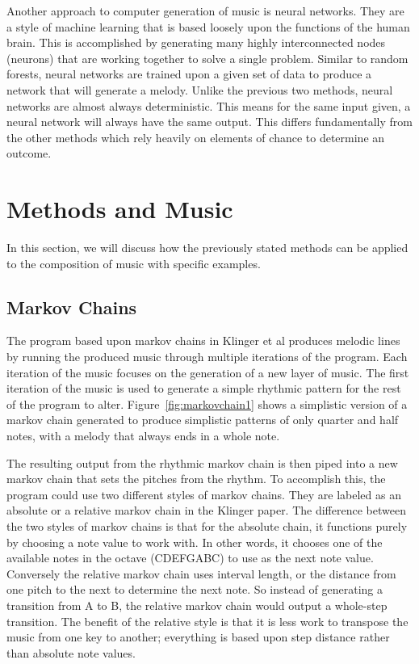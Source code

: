 \documentclass{sig-alternate}
\begin{document}
	Another approach to computer generation of music is neural networks. They are a style of machine learning that is based loosely upon the functions of the human brain. This is accomplished by generating many highly interconnected nodes (neurons) that are working together to solve a single problem. Similar to random forests, neural networks are trained upon a given set of data to produce a network that will generate a melody. Unlike the previous two methods, neural networks are almost always deterministic. This means for the same input given, a neural network will always have the same output. This differs fundamentally from the other methods which rely heavily on elements of chance to determine an outcome.

\section{Methods and Music}
\label{sec:methodsandmusic}
	In this section, we will discuss how the previously stated methods can be applied to the composition of music with specific examples.
\subsection{Markov Chains}
\label{sec:markovmethods}
	The program based upon markov chains in Klinger et al produces melodic lines by running the produced music through multiple iterations of the program. Each iteration of the music focuses on the generation of a new layer of music. The first iteration of the music is used to generate a simple rhythmic pattern for the rest of the program to alter. Figure~\ref{fig:markovchain1} shows a simplistic version of a markov chain generated to produce simplistic patterns of only quarter and half notes, with a melody that always ends in a whole note.

	The resulting output from the rhythmic markov chain is then piped into a new markov chain that sets the pitches from the rhythm. To accomplish this, the program could use two different styles of markov chains. They are labeled as an absolute or a relative markov chain in the Klinger paper. The difference between the two styles of markov chains is that for the absolute chain, it functions purely by choosing a note value to work with. In other words, it chooses one of the available notes in the octave (CDEFGABC) to use as the next note value. Conversely the relative markov chain uses interval length, or the distance from one pitch to the next to determine the next note. So instead of generating a transition from A to B, the relative markov chain would output a whole-step transition. The benefit of the relative style is that it is less work to transpose the music from one key to another; everything is based upon step distance rather than absolute note values.
\end{document}
